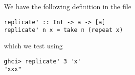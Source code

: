 
We have the following definition in the file 
\scriptsize\begin{verbatim}
replicate' :: Int -> a -> [a]
replicate' n x = take n (repeat x)
\end{verbatim}
which we test using
\scriptsize\begin{verbatim}
ghci> replicate' 3 'x'
"xxx"
\end{verbatim}\normalsize
